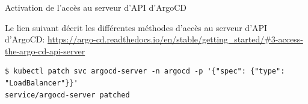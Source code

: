 
\begin{frame}[fragile]{Activation de l'accès au serveur d'API d'ArgoCD}

Le lien suivant décrit les différentes méthodes d'accès au serveur d'API d'ArgoCD: \url{https://argo-cd.readthedocs.io/en/stable/getting_started/#3-access-the-argo-cd-api-server}

\begin{tiny}
\begin{Verbatim}[commandchars=\&\#\#]
$ kubectl patch svc argocd-server -n argocd -p '{"spec": {"type": "LoadBalancer"}}'
service/argocd-server patched
\end{Verbatim}
\end{tiny}

\end{frame}


